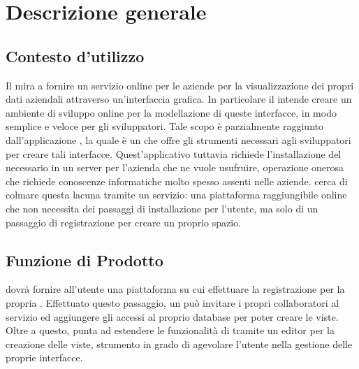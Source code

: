 \section{Descrizione generale}
\subsection{Contesto d'utilizzo}
Il   mira a fornire un servizio online per le aziende per la visualizzazione dei propri dati aziendali attraverso un'interfaccia grafica. In particolare il  intende creare un ambiente di sviluppo online per la modellazione di queste interfacce, in modo semplice e veloce per gli sviluppatori.
Tale scopo è parzialmente raggiunto dall'applicazione , la quale è un  che offre gli strumenti necessari agli sviluppatori per creare tali interfacce. Quest'applicativo tuttavia richiede l'installazione del  necessario in un server per l'azienda che ne vuole usufruire, operazione onerosa che richiede conoscenze informatiche molto spesso assenti nelle aziende.  cerca di colmare questa lacuna tramite un servizio: una piattaforma raggiungibile online che non necessita dei passaggi di installazione per l'utente, ma solo di un passaggio di registrazione per creare un proprio spazio.

\subsection{Funzione di Prodotto}
 dovrà fornire all'utente una piattaforma su cui effettuare la registrazione per la propria . Effettuato questo passaggio, un  pu\`o invitare i propri collaboratori al servizio ed aggiungere gli accessi al proprio database  per poter creare le viste.
Oltre a questo,  punta ad estendere le funzionalità di  tramite un editor per la creazione delle viste, strumento in grado di agevolare l'utente nella gestione delle proprie interfacce.


